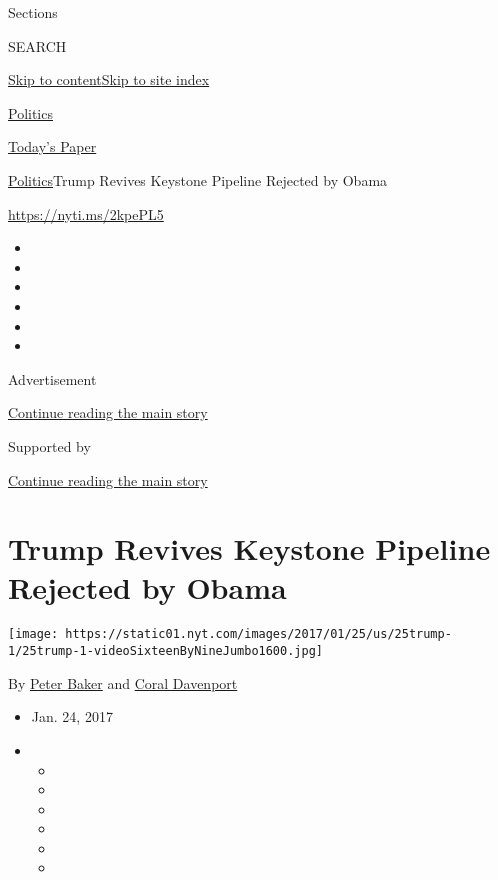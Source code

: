 Sections

SEARCH

\protect\hyperlink{site-content}{Skip to
content}\protect\hyperlink{site-index}{Skip to site index}

\href{https://www.nytimes.com/section/politics}{Politics}

\href{https://myaccount.nytimes.com/auth/login?response_type=cookie\&client_id=vi}{}

\href{https://www.nytimes.com/section/todayspaper}{Today's Paper}

\href{/section/politics}{Politics}\textbar{}Trump Revives Keystone
Pipeline Rejected by Obama

\url{https://nyti.ms/2kpePL5}

\begin{itemize}
\item
\item
\item
\item
\item
\item
\end{itemize}

Advertisement

\protect\hyperlink{after-top}{Continue reading the main story}

Supported by

\protect\hyperlink{after-sponsor}{Continue reading the main story}

\hypertarget{trump-revives-keystone-pipeline-rejected-by-obama}{%
\section{Trump Revives Keystone Pipeline Rejected by
Obama}\label{trump-revives-keystone-pipeline-rejected-by-obama}}

\texttt{[image: https://static01.nyt.com/images/2017/01/25/us/25trump-1/25trump-1-videoSixteenByNineJumbo1600.jpg]}

By \href{http://www.nytimes.com/by/peter-baker}{Peter Baker} and
\href{https://www.nytimes.com/by/coral-davenport}{Coral Davenport}

\begin{itemize}
\item
  Jan. 24, 2017
\item
  \begin{itemize}
  \item
  \item
  \item
  \item
  \item
  \item
  \end{itemize}
\end{itemize}

